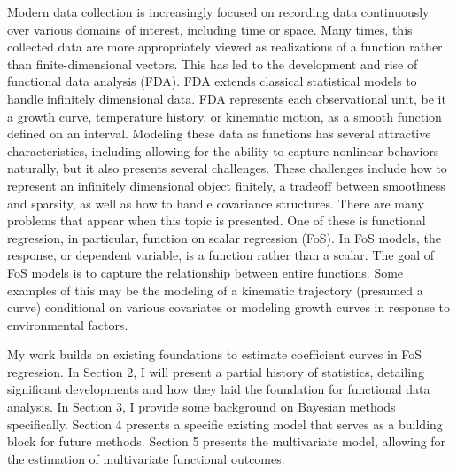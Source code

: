 Modern data collection is increasingly focused on recording data continuously over various domains of interest, including time or space.  
Many times, this collected data are more appropriately viewed as realizations of a function rather than finite-dimensional vectors.  
This has led to the development and rise of functional data analysis (FDA).  
FDA extends classical statistical models to handle infinitely dimensional data.  
FDA represents each observational unit, be it a growth curve, temperature history, or kinematic motion, as a smooth function defined on an interval.  
Modeling these data as functions has several attractive characteristics, including allowing for the ability to capture nonlinear behaviors naturally, but it also presents several challenges.  
These challenges include how to represent an infinitely dimensional object finitely, a tradeoff between smoothness and sparsity, as well as how to handle covariance structures.
There are many problems that appear when this topic is presented.  
One of these is functional regression, in particular, function on scalar regression (FoS).  In FoS models, the response, or dependent variable, is a function rather than a scalar.  
The goal of FoS models is to capture the relationship between entire functions.  
Some examples of this may be the modeling of a kinematic trajectory (presumed a curve) conditional on various covariates or modeling growth curves in response to environmental factors.  

My work builds on existing foundations to estimate coefficient curves in FoS regression.  
In Section 2, I will present a partial history of statistics, detailing significant developments and how they laid the foundation for functional data analysis.  
In Section 3, I provide some background on Bayesian methods specifically.  
Section 4 presents a specific existing model that serves as a building block for future methods.  
Section 5 presents the multivariate model, allowing for the estimation of multivariate functional outcomes.   